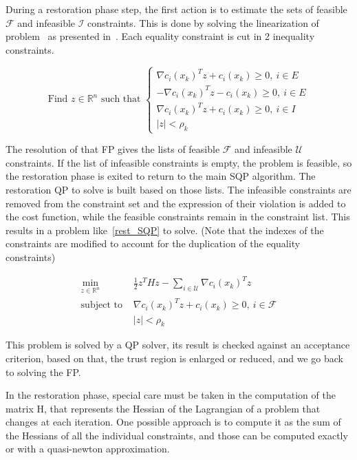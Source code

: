 During a restoration phase step, the first action is to estimate the sets of feasible $\mathcal{F}$ and infeasible $\mathcal{I}$ constraints.
This is done by solving the linearization of problem~ as presented in~.
Each equality constraint is cut in 2 inequality constraints.

\begin{equation}
  \text{Find $z\in\mathbb{R}^n$ such that }
  \left\{
  \begin{array}{l}
    {\nabla c_i(x_k)}^T z+c_i(x_k)\geq 0,\ i\in E \\
    -{\nabla c_i(x_k)}^T z-c_i(x_k)\geq 0,\ i\in E \\
    {\nabla c_i(x_k)}^T z+c_i(x_k)\geq 0,\ i\in I\\
    |z|<\rho_k
  \end{array}
  \right.
\label{eq:FP}
\end{equation}

The resolution of that FP gives the lists of feasible $\mathcal{F}$ and infeasible $\mathcal{U}$ constraints.
If the list of infeasible constraints is empty, the problem is feasible, so the restoration phase is exited to return to the main SQP algorithm.
The restoration QP to solve is built based on those lists.
The infeasible constraints are removed from the constraint set and the expression of their violation is added to the cost function, while the feasible constraints remain in the constraint list.
This results in a problem like~\ref{rest_SQP} to solve.
(Note that the indexes of the constraints are modified to account for the duplication of the equality constraints)

\begin{equation}
  \begin{array}{ll}
    \min\limits_{z\in \mathbb{R}^n}{} & \frac{1}{2} z^T Hz - \sum\limits_{i\in\mathcal{U}}{\nabla c_i(x_k)}^T z \\
    \text{subject to } & {\nabla c_i(x_k)}^T z+c_i(x_k)\geq 0,\ i \in \mathcal{F} \\
                       & |z|<\rho_k
  \end{array}
\label{rest_SQP}
\end{equation}

This problem is solved by a QP solver, its result is checked against an acceptance criterion, based on that, the trust region is enlarged or reduced, and we go back to solving the FP\@.

In the restoration phase, special care must be taken in the computation of the matrix H, that represents the Hessian of the Lagrangian of a problem that changes at each iteration.
One possible approach is to compute it as the sum of the Hessians of all the individual constraints, and those can be computed exactly or with a quasi-newton approximation.


